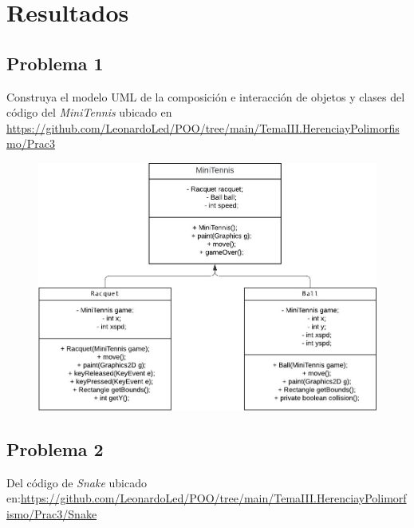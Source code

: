 \documentclass[11pt, twocolumn]{article}
\begin{document}
  \newpage
  \section*{Resultados}
  \subsection*{Problema 1}
  Construya el modelo UML de la composición e interacción de objetos y clases del código del \textit{MiniTennis} ubicado en \url{https://github.com/LeonardoLed/POO/tree/main/TemaIII.HerenciayPolimorfismo/Prac3}

  \begin{figure}[ht]
    \includegraphics[width=\columnwidth, center]{P1.jpg}
  \end{figure}

  
  \subsection*{Problema 2}
  Del código de \textit{Snake} ubicado en:\url{https://github.com/LeonardoLed/POO/tree/main/TemaIII.HerenciayPolimorfismo/Prac3/Snake}
\end{document}
